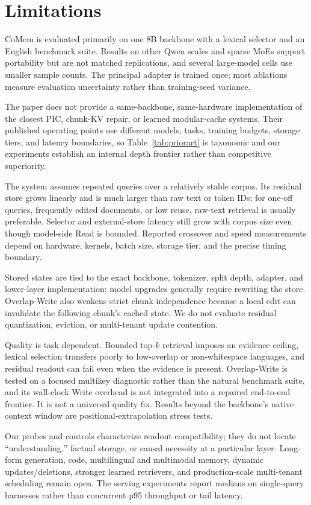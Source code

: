 \section*{Limitations}
\label{sec:limitations}

CoMem is evaluated primarily on one 8B backbone with a lexical selector and an
English benchmark suite. Results on other Qwen scales and sparse MoEs support
portability but are not matched replications, and several large-model cells use
smaller sample counts. The principal adapter is trained once; most ablations
measure evaluation uncertainty rather than training-seed variance.

The paper does not provide a same-backbone, same-hardware implementation of the
closest PIC, chunk-KV repair, or learned modular-cache systems. Their published
operating points use different models, tasks, training budgets, storage tiers,
and latency boundaries, so Table~\ref{tab:priorart} is taxonomic and our
experiments establish an internal depth frontier rather than competitive
superiority.

The system assumes repeated queries over a relatively stable corpus. Its
residual store grows linearly and is much larger than raw text or token IDs;
for one-off queries, frequently edited documents, or low reuse, raw-text
retrieval is usually preferable. Selector and external-store latency still grow
with corpus size even though model-side Read is bounded. Reported crossover and
speed measurements depend on hardware, kernels, batch size, storage tier, and
the precise timing boundary.

Stored states are tied to the exact backbone, tokenizer, split depth, adapter,
and lower-layer implementation; model upgrades generally require rewriting the
store. Overlap-Write also weakens strict chunk independence because a local edit
can invalidate the following chunk's cached state. We do not evaluate residual
quantization, eviction, or multi-tenant update contention.

Quality is task dependent. Bounded top-$k$ retrieval imposes an evidence ceiling,
lexical selection transfers poorly to low-overlap or non-whitespace languages,
and residual readout can fail even when the evidence is present. Overlap-Write
is tested on a focused multikey diagnostic rather than the natural benchmark
suite, and its wall-clock Write overhead is not integrated into a repaired
end-to-end frontier. It is not a universal quality fix. Results beyond the
backbone's native context window are positional-extrapolation stress tests.

Our probes and controls characterize readout compatibility; they do not locate
``understanding,'' factual storage, or causal necessity at a particular layer.
Long-form generation, code, multilingual and multimodal memory, dynamic
updates/deletions, stronger learned retrievers, and production-scale
multi-tenant scheduling remain open. The serving experiments report medians on
single-query harnesses rather than concurrent p95 throughput or tail latency.
